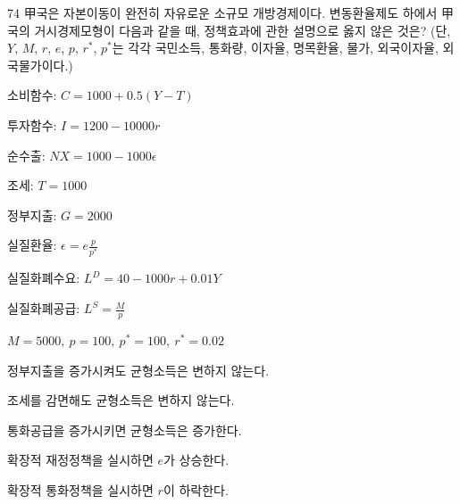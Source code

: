 \begin{question}{74}
甲국은 자본이동이 완전히 자유로운 소규모 개방경제이다. 변동환율제도 하에서 甲국의 거시경제모형이 다음과 같을 때, 정책효과에 관한 설명으로 옳지 않은 것은? (단, $Y$, $M$, $r$, $e$, $p$, $r^{*}$, $p^{*}$는 각각 국민소득, 통화량, 이자율, 명목환율, 물가, 외국이자율, 외국물가이다.)
\begin{framedtext}
소비함수: $C=1000+0.5(Y-T)$ \par
투자함수: $I=1200-10000r$ \par
순수출: $NX=1000-1000\epsilon$ \par
조세: $T=1000$ \par
정부지출: $G=2000$ \par
실질환율: $\epsilon =e\frac{p}{p^{*}}$ \par
실질화폐수요: $L^{D}=40-1000r+0.01Y$ \par
실질화폐공급: $L^{S}=\frac{M}{p}$ \par
$M=5000,\ p=100,\ p^{*}=100,\ r^{*}=0.02$ \par
\end{framedtext}
\begin{choices}
  \item 정부지출을 증가시켜도 균형소득은 변하지 않는다.
  \item 조세를 감면해도 균형소득은 변하지 않는다.
  \item 통화공급을 증가시키면 균형소득은 증가한다.
  \item 확장적 재정정책을 실시하면 $e$가 상승한다.
  \item 확장적 통화정책을 실시하면 $r$이 하락한다.
\end{choices}
\end{question}

